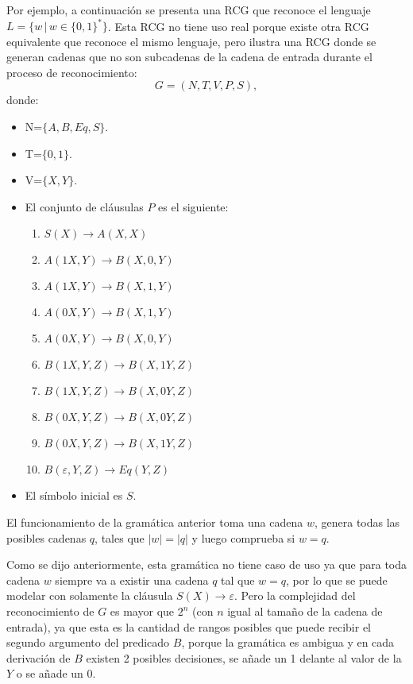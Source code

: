 \documentclass[12pt]{article}
\begin{document}
Por ejemplo, a continuación se presenta una RCG que reconoce el lenguaje $L=\{w\,|\,w\in\{0,1\}^*\}$. Esta RCG no tiene uso real porque existe otra RCG equivalente que reconoce el
mismo lenguaje, pero ilustra una RCG donde se generan cadenas que no son subcadenas de la cadena de entrada durante el proceso
de reconocimiento:
\[
    G = (N, T, V, P, S),
\]
donde:

\begin{itemize}
    \item  N=$\{A,B,Eq,S\}$.
    \item T=$\{0,1\}$.
    \item V=$\{X,Y\}$.
    \item El conjunto de cláusulas $P$ es el siguiente:
          \begin{enumerate}
              \item $S(X)\to A(X,X)$
              \item $A(1X,Y)\to B(X,0,Y)$
              \item $A(1X,Y)\to B(X,1,Y)$
              \item $A(0X,Y)\to B(X,1,Y)$
              \item $A(0X,Y)\to B(X,0,Y)$
              \item $B(1X,Y,Z)\to B(X,1Y,Z)$
              \item $B(1X,Y,Z)\to B(X,0Y,Z)$
              \item $B(0X,Y,Z)\to B(X,0Y,Z)$
              \item $B(0X,Y,Z)\to B(X,1Y,Z)$
              \item $B(\varepsilon,Y,Z)\to Eq(Y,Z)$
          \end{enumerate}
          
    \item El símbolo inicial es $S$.
\end{itemize}

El funcionamiento de la gramática anterior toma una cadena $w$, genera todas las posibles cadenas $q$, tales que 
$|w|=|q|$ y luego comprueba si $w = q$.

Como se dijo anteriormente, esta gramática no tiene caso de uso ya que para toda cadena $w$ siempre va a existir 
una cadena $q$ tal que $w=q$, por lo que se puede modelar con solamente la cláusula $S(X)\to \varepsilon$. 
Pero la complejidad del reconocimiento de $G$ es mayor que $2^n$ (con $n$ igual al tamaño de la cadena de entrada), 
ya que esta es la cantidad de rangos posibles que puede recibir el segundo argumento  del predicado $B$, porque la gramática es ambigua y en cada derivación de $B$ existen 2 posibles decisiones, se añade un 1 delante al valor de la $Y$ o se añade un $0$. 
\end{document}
